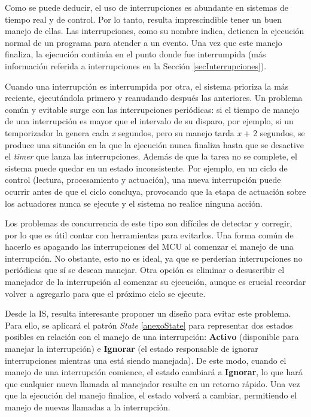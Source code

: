 Como se puede deducir, el uso de interrupciones es abundante en sistemas de tiempo real y de control. Por lo tanto, resulta imprescindible tener un buen manejo de ellas. Las interrupciones, como su nombre indica, detienen la ejecución normal de un programa para atender a un evento. Una vez que este manejo finaliza, la ejecución continúa en el punto donde fue interrumpida (más información referida a interrupciones en la Sección \ref{secInterrupciones}).

Cuando una interrupción es interrumpida por otra, el sistema prioriza la más reciente, ejecutándola primero y reanudando después las anteriores. Un problema común y evitable surge con las interrupciones periódicas: si el tiempo de manejo de una interrupción es mayor que el intervalo de su disparo, por ejemplo, si un temporizador la genera cada \textit{x} segundos, pero su manejo tarda \textit{x} + 2 segundos, se produce una situación en la que la ejecución nunca finaliza hasta que se desactive el \textit{timer} que lanza las interrupciones. Además de que la tarea no se complete, el sistema puede quedar en un estado inconsistente. Por ejemplo, en un ciclo de control (lectura, procesamiento y actuación), una nueva interrupción puede ocurrir antes de que el ciclo concluya, provocando que la etapa de actuación sobre los actuadores nunca se ejecute y el sistema no realice ninguna acción.

Los problemas de concurrencia de este tipo son difíciles de detectar y corregir, por lo que es útil contar con herramientas para evitarlos. Una forma común de hacerlo es apagando las interrupciones del \gls{MCU} al comenzar el manejo de una interrupción. No obstante, esto no es ideal, ya que se perderían interrupciones no periódicas que sí se desean manejar. Otra opción es eliminar o desuscribir el manejador de la interrupción al comenzar su ejecución, aunque es crucial recordar volver a agregarlo para que el próximo ciclo se ejecute.

Desde la \gls{IS}, resulta interesante proponer un diseño para evitar este problema. Para ello, se aplicará el patrón \textit{State} \ref{anexoState} para representar dos estados posibles en relación con el manejo de una interrupción: \textbf{Activo} (disponible para manejar la interrupción) e \textbf{Ignorar} (el estado responsable de ignorar interrupciones mientras una está siendo manejada). De este modo, cuando el manejo de una interrupción comience, el estado cambiará a \textbf{Ignorar}, lo que hará que cualquier nueva llamada al manejador resulte en un retorno rápido. Una vez que la ejecución del manejo finalice, el estado volverá a cambiar, permitiendo el manejo de nuevas llamadas a la interrupción.

